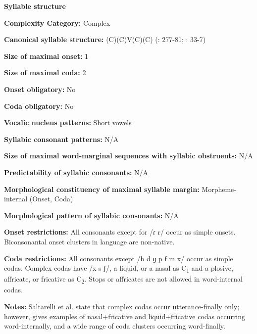 \textbf{Syllable structure}



\textbf{Complexity Category:} Complex



\textbf{Canonical syllable structure:} (C)(C)V(C)(C) (\citealt{SaltarelliEtAl1988}: 277-81; \citealt{Hualde2003}: 33-7)



\textbf{Size of maximal onset:} 1



\textbf{Size of maximal coda:} 2



\textbf{Onset obligatory:} No



\textbf{Coda obligatory:} No



\textbf{Vocalic nucleus patterns:} Short vowels



\textbf{Syllabic consonant patterns:} N/A



\textbf{Size of maximal word{}-marginal sequences with syllabic obstruents:} N/A



\textbf{Predictability of syllabic consonants:} N/A



\textbf{Morphological constituency of maximal syllable margin:} Morpheme-internal (Onset, Coda)



\textbf{Morphological pattern of syllabic consonants:} N/A



\textbf{Onset restrictions:} All consonants except for /ɾ r/ occur as simple onsets. Biconsonantal onset clusters in language are non-native.



\textbf{Coda restrictions:} All consonants except /b d ɡ p f m x/ occur as simple codas. Complex codas have /x s ʃ/, a liquid, or a nasal as C\textsubscript{1} and a plosive, affricate, or fricative as C\textsubscript{2}. Stops or affricates are not allowed in word-internal codas.



\textbf{Notes:} Saltarelli et al. state that complex codas occur utterance-finally only; however, \citet{Hualde2003} gives examples of nasal+fricative and liquid+fricative codas occurring word-internally, and a wide range of coda clusters occurring word-finally.




